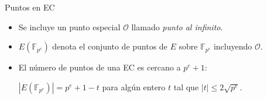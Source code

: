 \documentclass{beamer}
\theoremstyle{remark}
\begin{document}
\begin{frame}{Puntos en EC}
  \begin{itemize}
    \item<2-> Se incluye un punto especial $\mathcal{O}$ llamado \textit{punto al infinito}.
    \item<3-> $E(\mathbb{F}_{p^e})$ denota el conjunto de puntos de $E$ sobre $\mathbb{F}_{p^e}$
      incluyendo $\mathcal{O}$.
    \item<4-> El número de puntos de una EC es cercano a $p^e + 1$:
      \begin{theorem}[Hasse]
        $\left|E(\mathbb{F}_{p^e})\right| = p^e + 1 - t$ para algún entero $t$ tal que
        $|t| \leq 2\sqrt{p^e}$.
      \end{theorem}
  \end{itemize}
\end{frame}
\end{document}
